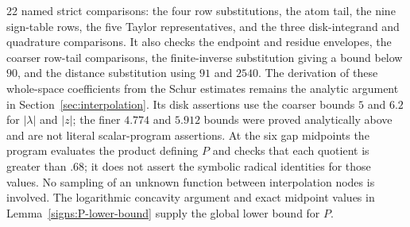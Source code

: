22 named strict comparisons: the four row substitutions, the atom tail,
the nine sign-table rows, the five Taylor representatives, and the three
disk-integrand and quadrature comparisons.  It also checks the endpoint
and residue envelopes, the coarser row-tail comparisons, the finite-inverse
substitution giving a bound below $90$,
and the distance substitution using $91$ and $2540$.  The derivation of
these whole-space coefficients from the Schur estimates remains the
analytic argument in Section~\ref{sec:interpolation}.
Its disk assertions use the coarser bounds $5$ and $6.2$ for
$|\lambda|$ and $|z|$; the finer $4.774$ and $5.912$ bounds were proved
analytically above and are not literal scalar-program assertions.
At the six gap midpoints the program evaluates the product defining $P$
and checks that each quotient is greater than $.68$; it does not assert
the symbolic radical identities for those values.  No sampling of an
unknown function between interpolation nodes is involved.  The
logarithmic concavity argument and exact midpoint values in
Lemma~\ref{signs:P-lower-bound} supply the global lower bound for $P$.
